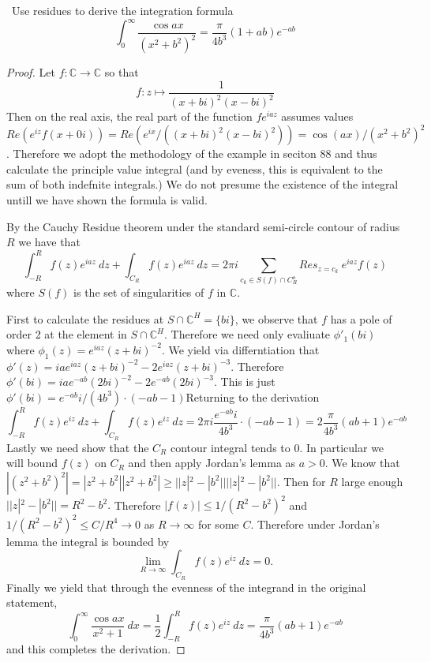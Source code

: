 \documentclass[11pt]{amsart}
\theoremstyle{definition}
\numberwithin{theorem}{section}
\numberwithin{definition}{section}
\numberwithin{equation}{section}
\begin{document}
\medskip {}\ Use residues to derive the integration formula
\begin{equation*}
\int_0^\infty \frac{\cos ax}{(x^2 + b^2)^2} = \frac{\pi}{4b^3}(1 + ab)e^{-ab}
\end{equation*}
\begin{proof}
			Let $f: \mathbb{C} \to \mathbb{C}$ so that 
	\begin{equation*}
		f: z \mapsto  \frac{1}{(x+bi)^2(x-bi)^2}
	\end{equation*}
	Then on the real axis, the real part of the  function $fe^{iaz}$ assumes values $Re(e^{iz}f(x + 0i)) = Re(e^{ix}/((x+bi)^2(x-bi)^2)) = \cos(ax)/(x^2 + b^2)^2$. Therefore we adopt the methodology of the example in seciton 88 and thus calculate the principle value integral (and by eveness, this is equivalent to the sum of both indefnite integrals.) We do not presume the existence of the integral untill we have shown the formula is valid.

	By the Cauchy Residue theorem under the standard semi-circle contour of radius $R$ we have that
	\begin{equation*}
		\int_{-R}^R f(z)e^{iaz}\ dz + \int_{C_R} f(z) e^{iaz}\ dz = 2\pi i \sum_{c_k \in S(f) \cap C_R^o} Res_{z=c_k}\ e^{iaz} f(z)
	\end{equation*}
	where $S(f)$ is the set of singularities of $f$ in $\mathbb{C}.$

	First to calculate the residues at $S \cap \mathbb{C}^H = \{bi\}$, we observe that $f$ has a pole of order 2 at the element in $S \cap \mathbb{C}^H$. Therefore we need only evaliuate $\phi'_1(bi)$ where $\phi_1(z) = e^{iaz}(z + bi)^{-2}$. We yield via differntiation that $\phi'(z) = iae^{iaz}(z + bi)^{-2} -2e^{iaz}(z + bi)^{-3}$. Therefore $\phi'(bi) = iae^{-ab}(2bi)^{-2} - 2e^{-ab}(2bi)^{-3}.$  This is just $\phi'(bi) = e^{-ab}i/(4b^3)\cdot(-ab - 1)$Returning to the derivation
	\begin{equation*}
		\int_{-R}^R f(z)e^{iz}\ dz + \int_{C_R} f(z) e^{iz}\ dz = 2\pi i \frac{e^{-ab}i}{4b^3}\cdot(-ab - 1) =  2 \frac{\pi}{4b^3}(ab + 1)e^{-ab}
	\end{equation*}
	Lastly we need show that the $C_R$ contour integral tends to $0$.  In particular we will  bound $f(z)$ on $C_R$
	and then apply Jordan's lemma as $a > 0$.  We know that $|(z^2 + b^2)^2| = |z^2 + b^2||z^2 + b^2| \geq ||z|^2 - |b^2||||z|^2 - |b^2||.$ Then for $R$ large enough $||z|^2 - |b^2|| = R^2 - b^2.$
	Therefore $|f(z)| \leq 1/(R^2 -b^2)^2$ and $1/(R^2 - b^2)^2 \leq C/R^4 \to 0$ as $R \to \infty$ for some $C.$
	Therefore under Jordan's lemma the integral is bounded by
	\begin{equation*}
		\lim_{R \to \infty} \int_{C_R} f(z) e^{iz}\ dz = 0.
	\end{equation*}
	Finally we yield that through the evenness of the integrand in the original statement,
	\begin{equation*}
		\int_0^\infty \frac{\cos ax}{x^2 + 1}\ dx = \frac{1}{2}  \int_{-R}^R f(z)e^{iz}\ dz = \frac{\pi}{4b^3}(ab + 1)e^{-ab}
	\end{equation*}
	and this completes the derivation.
\end{proof}
\end{document}
